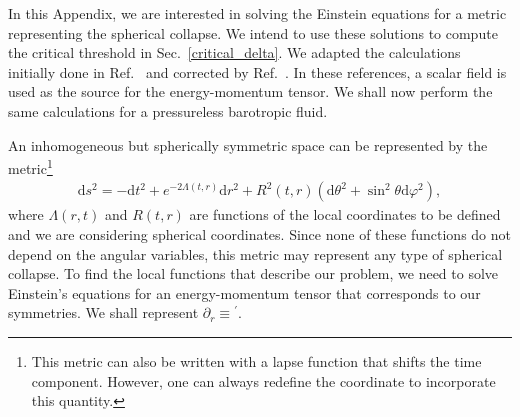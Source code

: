 \documentclass[a4paper,11pt]{article}
\begin{document}
In this Appendix, we are interested in solving the Einstein equations for a metric representing the spherical collapse. We intend to use these solutions to compute the critical threshold in Sec.~\ref{critical_delta}. We adapted the calculations initially done in Ref.~\cite{Gonccalves2000} and corrected by Ref.~\cite{Martin2020}. In these references, a scalar field is used as the source for the energy-momentum tensor. We shall now perform the same calculations for a pressureless barotropic fluid. 

An inhomogeneous but spherically symmetric space can be represented by the metric\footnote{This metric can also be written with a lapse function that shifts the time component. However, one can always redefine the coordinate to incorporate this quantity.}
\begin{align}
	\mathrm{d} s^2=-\mathrm{d}t^2+e^{-2 \Lambda(t, r)} \mathrm{d} r^2+R^2(t, r)\left(\mathrm{d} \theta^2+\sin ^2 \theta \mathrm{d} \varphi^2\right)
	,\end{align}
where $\Lambda(r,t)$ and $R(t,r)$ are functions of the local coordinates to be defined and we are considering spherical coordinates. Since none of these functions do not depend on the angular variables, this metric may represent any type of spherical collapse. To find the local functions that describe our problem, we need to solve Einstein's equations for an energy-momentum tensor that corresponds to our symmetries. We shall represent $\partial_r \equiv {}^\prime$.
\end{document}
